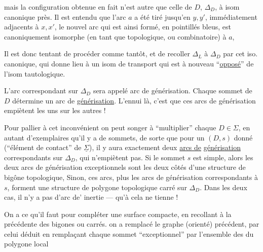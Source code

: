 mais la configuration obtenue en fait n'est autre que celle de $D$, $\Delta_D$, à isom canonique près. Il est entendu que l'arc $a$ a été tiré jusqu'en $y,y'$, immédiatement adjacents à $x,x'$, le nouvel arc qui est ainsi formé, en pointillés bleus, est  canoniquement isomorphe (en tant que  topologique, ou combinatoire) à $a$,

Il est donc tentant de procéder comme tantôt, et de recoller $\Delta_L$ à $\Delta_D$ par cet iso. canonique, qui donne lieu à un isom de transport
qui est à nouveau ``\uline{opposé}'' de l'isom tautologique.

L'arc correspondant sur $\Delta_D$ sera appelé arc de générisation. Chaque sommet de $D$ détermine un arc de \uline{générisation}. L'ennui là, c'est que ces arcs de générisation empiètent les uns sur les autres !

Pour pallier à cet inconvénient on peut songer à ``multiplier'' chaque $D\in\Sigma$, en autant d'exemplaires qu'il y a de sommets, de sorte que  pour un $(D,s)$ donné (``élément de contact'' de $\underline\Sigma$), il y aura exactement deux \uline{arcs de}  \uline{générisation}  correspondants sur $\Delta_D$, qui n'empiètent pas. Si le sommet $s$ est simple, alors les deux arcs de générisation exceptionnels sont les deux côtés d'une structure de bigône topologique, Sinon, ces arcs, plus les  arcs de générisation  correspondants à $s$, forment une structure de polygone topologique carré sur $\Delta_D$.  Dans les deux cas, il n'y a pas d'arc de' inertie --- qu'à cela ne tienne !

On a  ce qu'il faut pour compléter une surface compacte, en recollant à la précédente des bigones ou carrés.    on a remplacé le graphe (orienté) précédent, par celui déduit en remplaçant chaque sommet ``exceptionnel'' par l'ensemble des  du polygone local

